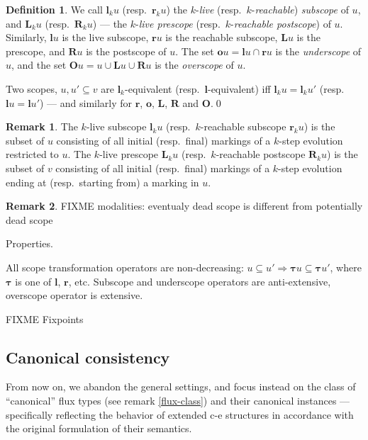 \documentclass [a4paper,12pt] {article}
\theoremstyle{definition}
\newtheorem{definition}{Definition}[section]
\newtheorem{remark}{Remark}[section]
\begin{document}
\begin {definition}
We call $\bm {l}_ku$ (resp.\ $\bm {r}_ku$) the $k$-{\em live}\/
(resp.\ $k$-{\em reachable}\/) {\em subscope}\/ of $u$, and $\bm
{L}_ku$ (resp.\ $\bm {R}_ku$) --- the $k$-{\em live prescope}\/
(resp.\ $k$-{\em reachable postscope}\/) of $u$.  Similarly, $\bm
{l}u$ is the live subscope, $\bm {r}u$ is the reachable subscope, $\bm
{L}u$ is the prescope, and $\bm {R}u$ is the postscope of $u$.  The
set $\bm {o}u = \bm {l}u \cap \bm {r}u$ is the {\em underscope}\/ of
$u$, and the set $\bm {O}u = u \cup \bm {L}u \cup \bm {R}u$ is the
{\em overscope}\/ of $u$.

Two scopes, $u, u' \subseteq v$ are $\bm {l}_k$-equivalent
(resp.\ $\bm {l}$-equivalent) iff $\bm {l}_ku = \bm {l}_ku'$
(resp.\ $\bm {l}u = \bm {l}u'$) --- and similarly for $\bm {r}$, $\bm
{o}$, $\bm {L}$, $\bm {R}$ and $\bm {O}$.\qed
\end {definition}

\begin {remark}
  The $k$-live subscope $\bm {l}_ku$ (resp.\ $k$-reachable subscope
  $\bm {r}_ku$) is the subset of $u$ consisting of all initial
  (resp.\ final) markings of a $k$-step evolution restricted to $u$.
  The $k$-live prescope $\bm {L}_ku$ (resp.\ $k$-reachable postscope
  $\bm {R}_ku$) is the subset of $v$ consisting of all initial
  (resp.\ final) markings of a $k$-step evolution ending at
  (resp.\ starting from) a marking in $u$.
\end {remark}

\begin {remark}
  FIXME modalities: eventualy dead scope is different from potentially
  dead scope
\end {remark}

Properties.

All scope transformation operators are non-decreasing:
$u \subseteq u' \Longrightarrow \bm {\tau}u \subseteq \bm {\tau}u'$,
where $\bm {\tau}$ is one of $\bm {l}$, $\bm {r}$, etc.  Subscope and
underscope operators are anti-extensive, overscope operator is
extensive.

FIXME Fixpoints

\subsection {Canonical consistency}

From now on, we abandon the general settings, and focus instead on the
class of ``canonical'' flux types (see remark \ref {flux-class}) and
their canonical instances --- specifically reflecting the behavior of
extended \mbox {c-e} structures in accordance with the original
formulation of their semantics.
\end{document}
